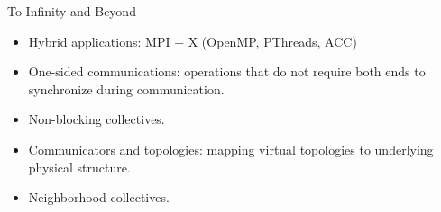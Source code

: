 \begin{frame}{To Infinity and Beyond}

\begin{itemize}
\vspace{10mm}
\item Hybrid applications: MPI + X (OpenMP, PThreads, ACC)
\item One-sided communications: operations that do not require both ends to synchronize during communication.
\item Non-blocking collectives.
\item Communicators and topologies: mapping virtual topologies to underlying physical structure. 
\item Neighborhood collectives.
\end{itemize}

\end{frame}

